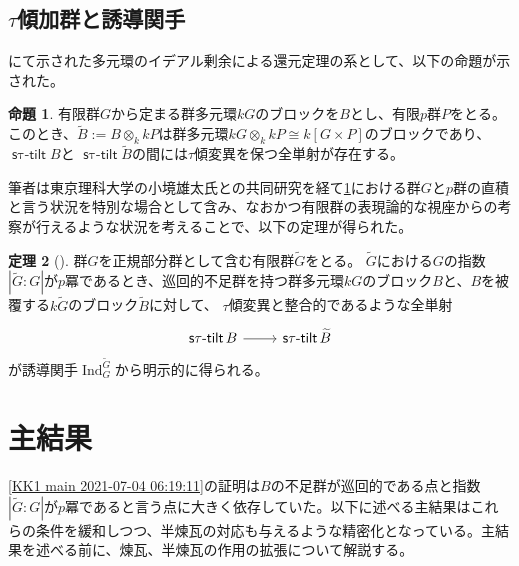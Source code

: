 \documentclass[a4paper,uplatex,dvipdfmx]{jsarticle}
\theoremstyle{definition}
\newtheorem{theorem}{定理}[section]
\newtheorem{proposition}[theorem]{命題}
\newcommand{\induc}{{\operatorname{Ind}\nolimits}}
\newcommand{\stautilt}{\operatorname{\mathsf{s\tau-tilt}}}
\begin{document}
\subsection{\texorpdfstring{\(\tau\)}{τ}傾加群と誘導関手}
\cite{MR3856858}にて示された多元環のイデアル剰余による還元定理の系として、以下の命題が示された。
\begin{proposition}\label{EJR cor 2021-07-04 06:08:56}
  有限群\(G\)から定まる群多元環\(kG\)のブロックを\(B\)とし、有限\(p\)群\(P\)をとる。このとき、\(\widetilde{B}:=B\otimes_kkP\)は群多元環\(kG\otimes_k kP\cong k[G\times P]\)のブロックであり、\(\stautilt B\)と \(\stautilt \widetilde{B}\)の間には\(\tau\)傾変異を保つ全単射が存在する。
\end{proposition}
筆者は東京理科大学の小境雄太氏との共同研究を経て\cref{EJR cor 2021-07-04 06:08:56}における群\(G\)と\(p\)群の直積と言う状況を特別な場合として含み、なおかつ有限群の表現論的な視座からの考察が行えるような状況を考えることで、以下の定理が得られた。
\begin{theorem}[{\cite{MR4243358}}]
  群\(G\)を正規部分群として含む有限群\(\widetilde{G}\)をとる。
  \(\widetilde{G}\)における\(G\)の指数\(|\widetilde{G}:G|\)が\(p\)冪であるとき、巡回的不足群を持つ群多元環\(kG\)のブロック\(B\)と、\(B\)を被覆する\(k\widetilde{G}\)のブロック\(\widetilde{B}\)に対して、
  \(\tau\)傾変異と整合的であるような全単射
  \begin{equation}\label{KK1 main 2021-07-04 06:19:11}
    \begin{tikzcd}\label{KK1 main corr}
      \stautilt B\ar[r]&\stautilt \widetilde{B}
    \end{tikzcd}
  \end{equation}
  が誘導関手\(\induc_G^{\widetilde{G}}\)から明示的に得られる。
\end{theorem}

\section{主結果}
\cref{KK1 main 2021-07-04 06:19:11}の証明は\(B\)の不足群が巡回的である点と指数\(|\widetilde{G}:G|\)が\(p\)冪であると言う点に大きく依存していた。以下に述べる主結果はこれらの条件を緩和しつつ、半煉瓦の対応も与えるような精密化となっている。主結果を述べる前に、煉瓦、半煉瓦の作用の拡張について解説する。
\end{document}
